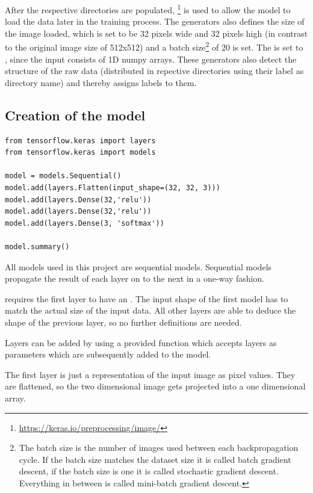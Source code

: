 After the respective directories are populated, \footnote{\url{https://keras.io/preprocessing/image/}} is used to allow the model to load the data later in the training process.
The generators also defines the size of the image loaded, which is set to be 32 pixels wide and 32 pixels high (in contrast to the original image size of 512x512) and a batch size\footnote{The batch size is the number of images used between each backpropagation cycle.
If the batch size matches the dataset size it is called batch gradient descent, if the batch size is one it is called stochastic gradient descent.
Everything in between is called mini-batch gradient descent.} of 20 is set.
The  is set to , since the input consists of 1D numpy arrays.
These generators also detect the structure of the raw data (distributed in repective directories using their label as directory name) and thereby assigns labels to them.

\subsection{Creation of the model}

\begin{lstlisting}
from tensorflow.keras import layers
from tensorflow.keras import models

model = models.Sequential()
model.add(layers.Flatten(input_shape=(32, 32, 3)))
model.add(layers.Dense(32,'relu'))
model.add(layers.Dense(32,'relu'))
model.add(layers.Dense(3, 'softmax'))

model.summary()
\end{lstlisting}

All models used in this project are sequential models.
Sequential models propagate the result of each layer on to the next in a one-way fashion.

 requires the first layer to have an .
The input shape of the first model has to match the actual size of the input data.
All other layers are able to deduce the shape of the previous layer, so no further definitions are needed.

Layers can be added by using a provided  function which accepts layers as parameters which are subsequently added to the model.

The first layer is just a representation of the input image as pixel values.
They are flattened, so the two dimensional image gets projected into a one dimensional array.

